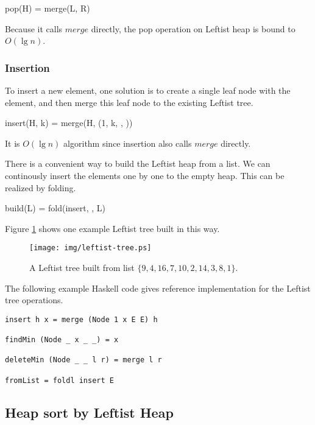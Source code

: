 \documentclass{article}
\begin{document}
\be
pop(H) = merge(L, R)
\ee

Because it calls $merge$ directly, the pop operation on Leftist heap is bound
to $O(\lg n)$.

\subsubsection{Insertion}

To insert a new element, one solution is to create a single
leaf node with the element, and then merge this leaf node to
the existing Leftist tree.

\be
insert(H, k) = merge(H, (1, k, \Phi, \Phi))
\ee

It is $O(\lg n)$ algorithm since insertion also calls $merge$ directly.

There is a convenient way to build the Leftist heap from
a list. We can continously insert the elements one by one
to the empty heap. This can be realized by folding.

\be
build(L) = fold(insert, \Phi, L)
\ee

Figure \ref{fig:leftist-tree} shows one example Leftist tree
built in this way.

\begin{figure}[htbp]
   \begin{center}
   	  \texttt{[image: img/leftist-tree.ps]}
    \caption{A Leftist tree built from list $\{9, 4, 16, 7, 10, 2, 14, 3, 8, 1\}$.}
    \label{fig:leftist-tree}
   \end{center}
\end{figure}

The following example Haskell code gives reference implementation
for the Leftist tree operations.

\lstset{language=Haskell}
\begin{lstlisting}
insert h x = merge (Node 1 x E E) h

findMin (Node _ x _ _) = x

deleteMin (Node _ _ l r) = merge l r

fromList = foldl insert E
\end{lstlisting}

\subsection{Heap sort by Leftist Heap}
\end{document}
